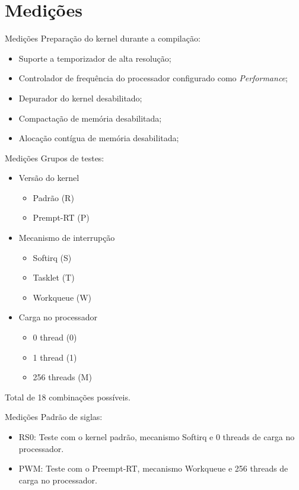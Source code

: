 \documentclass[12pt,brazil]{beamer}
\begin{document}
\section{Medições}
\begin{frame}{Medições}
    Preparação do kernel durante a compilação:
    \begin{itemize}
        \item Suporte a temporizador de alta resolução;
        \item Controlador de frequência do processador configurado como \textit{Performance};
        \item Depurador do kernel desabilitado;
        \item Compactação de memória desabilitada;
        \item Alocação contígua de memória desabilitada;
    \end{itemize}
\end{frame}

\begin{frame}{Medições}
    Grupos de testes:
    \begin{itemize}
        \item Versão do kernel
        \begin{itemize}
            \item Padrão (R)
            \item Prempt-RT (P)
        \end{itemize}
        \item Mecanismo de interrupção
        \begin{itemize}
            \item Softirq (S)
            \item Tasklet (T)
            \item Workqueue (W)
        \end{itemize}
        \item Carga no processador
        \begin{itemize}
            \item 0 thread (0)
            \item 1 thread (1)
            \item 256 threads (M)
        \end{itemize}
    \end{itemize}
    Total de 18 combinações possíveis.
\end{frame}

\begin{frame}{Medições}
    Padrão de siglas:
    \begin{itemize}
        \item RS0: Teste com o kernel padrão, mecanismo Softirq e 0 threads de carga no processador.
        \item PWM: Teste com o Preempt-RT, mecanismo Workqueue e 256 threads de carga no processador.
    \end{itemize}
\end{frame}
\end{document}
